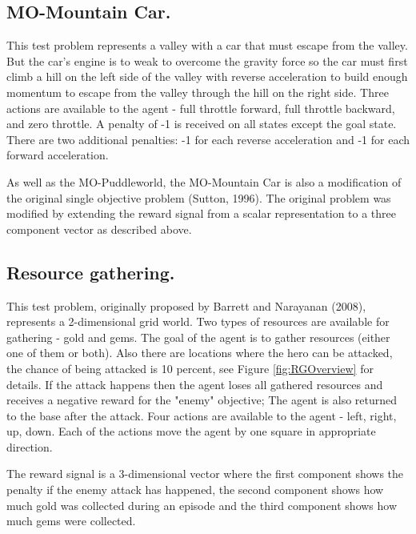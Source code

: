{{\subsection{MO-Mountain Car.}
This test problem represents a valley with a car that must escape from the valley. But the car's engine is to weak to overcome the gravity force so the car must first climb a hill on the left side of the valley with reverse acceleration to build enough momentum to escape from the valley through the hill on the right side. Three actions are available to the agent - full throttle forward, full throttle backward, and zero throttle. A penalty of -1 is received on all states except the goal state. There are two additional penalties: -1 for each reverse acceleration and -1 for each forward acceleration.

As well as the MO-Puddleworld, the MO-Mountain Car is also a modification of the original single objective problem (Sutton, 1996\nocite{sutton1996generalization}). The original problem was modified by extending the reward signal from a scalar representation to a three component vector as described above. 

\subsection{Resource gathering.}
This test problem, originally proposed by Barrett and Narayanan (2008)\nocite{barrett2008learning}, represents a 2-dimensional grid world. Two types of resources are available for gathering - gold and gems. The goal of the agent is to gather resources (either one of them or both). Also there are locations where the hero can be attacked, the chance of being attacked is 10 percent, see Figure \ref{fig:RGOverview} for details. If the attack happens then the agent loses all gathered resources and receives a negative reward for the "enemy" objective; The agent is also returned to the base after the attack. Four actions are available to the agent - left, right, up, down. Each of the actions move the agent by one square in appropriate direction.

The reward signal is a 3-dimensional vector where the first component shows the penalty if the enemy attack has happened, the second component shows how much gold was collected during an episode and the third component shows how much gems were collected.

}}
